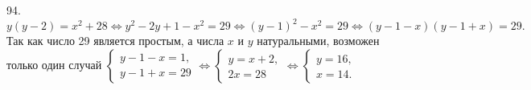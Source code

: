 94. $y(y-2)=x^2+28\Leftrightarrow y^2-2y+1-x^2=29\Leftrightarrow (y-1)^2-x^2=29\Leftrightarrow (y-1-x)(y-1+x)=29.$ Так как число 29 является простым, а числа $x$ и $y$ натуральными, возможен только один случай $\begin{cases}y-1-x=1,\\ y-1+x=29\end{cases}\Leftrightarrow \begin{cases}y=x+2,\\ 2x=28\end{cases}\Leftrightarrow
\begin{cases}y=16,\\ x=14.\end{cases}$\\

